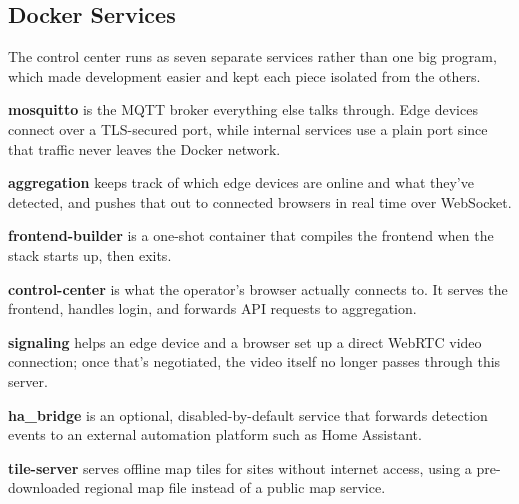 \documentclass[12pt,a4paper]{report}
\begin{document}
\subsection{Docker Services}

The control center runs as seven separate services rather than one big
program, which made development easier and kept each piece isolated from
the others.

\textbf{mosquitto} is the MQTT broker everything else talks through. Edge
devices connect over a TLS-secured port, while internal services use a
plain port since that traffic never leaves the Docker network.

\textbf{aggregation} keeps track of which edge devices are online and what
they've detected, and pushes that out to connected browsers in real time
over WebSocket.

\textbf{frontend-builder} is a one-shot container that compiles the
frontend when the stack starts up, then exits.

\textbf{control-center} is what the operator's browser actually connects
to. It serves the frontend, handles login, and forwards API requests to
aggregation.

\textbf{signaling} helps an edge device and a browser set up a direct
WebRTC video connection; once that's negotiated, the video itself no
longer passes through this server.

\textbf{ha\_bridge} is an optional, disabled-by-default service that
forwards detection events to an external automation platform such as
Home Assistant.

\textbf{tile-server} serves offline map tiles for sites without internet
access, using a pre-downloaded regional map file instead of a public map
service.
\end{document}
